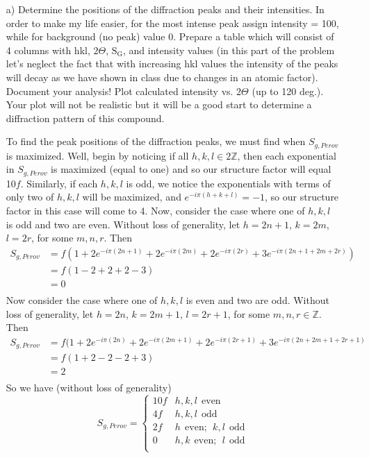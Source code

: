 \documentclass{article}
\begin{document}
\begin{enumerate}
    \item[a)] Determine the positions of the diffraction peaks and their intensities. In order to make my life easier, for the most intense peak assign intensity = 100, while for background (no peak) value 0. Prepare a table which will consist of 4 columns with hkl, $2\Theta$, $\text{S}_{\text{G}}$, and intensity values (in this part of the problem let's neglect the fact that with increasing hkl values the intensity of the peaks will decay as we have shown in class due to changes in an atomic factor). Document your analysis! Plot calculated intensity vs. $2\Theta$ (up to 120 deg.). Your plot will not be realistic but it will be a good start to determine a diffraction pattern of this compound.
    \newline
    
    To find the peak positions of the diffraction peaks, we must find when $S_{g, Perov}$ is maximized. Well, begin by noticing if all $h,k,l \in 2\mathbb{Z}$, then each exponential in $S_{g, Perov}$ is maximized (equal to one) and so our structure factor will equal 10$f$. Similarly, if each $h,k,l$ is odd, we notice the exponentials with terms of only two of $h,k,l$ will be maximized, and $e^{-i\pi(h + k + l)} = -1$, so our structure factor in this case will come to 4. Now, consider the case where one of $h,k,l$ is odd and two are even. Without loss of generality, let $h = 2n + 1$, $k = 2m$, $l = 2r$, for some $m,n,r$. Then
    \begin{align*}
        S_{g, Perov} &= f(1 + 2e^{-i\pi(2n + 1)} + 2e^{-i\pi(2m)} + 2e^{-i\pi(2r)} + 3e^{-i\pi(2n + 1 + 2m + 2r)}) \\
        &= f(1 - 2 + 2 + 2 - 3) \\
        &= 0 \\
    \end{align*}
    Now consider the case where one of $h,k,l$ is even and two are odd. Without loss of generality, let $h = 2n$, $k = 2m + 1$, $l = 2r + 1$, for some $m,n,r \in \mathbb{Z}$. Then
    \begin{align*}
        S_{g, Perov} &= f(1 + 2e^{-i\pi(2n)} + 2e^{-i\pi(2m + 1)} + 2e^{-i\pi(2r + 1)} + 3e^{-i\pi(2n + 2m + 1 + 2r + 1)} \\
        &= f(1 + 2 - 2 - 2 + 3) \\
        &= 2 \\
    \end{align*}
    So we have (without loss of generality)
    \[S_{g, Perov} = \begin{cases}
        10f & h,k,l \:\: \text{even} \\
        4f & h,k,l \:\: \text{odd} \\
        2f & h \:\: \text{even};\:\: k,l \:\: \text{odd} \\
        0 & h,k \:\: \text{even}; \:\: l \:\: \text{odd} \\
    \end{cases}\]
    

\end{enumerate}
\end{document}
